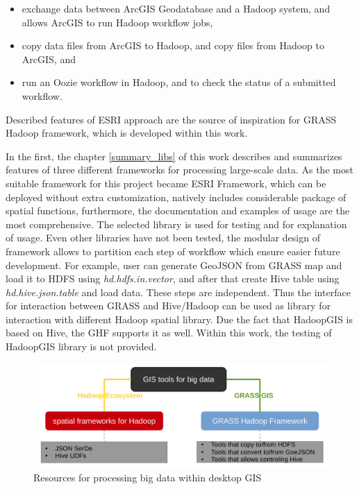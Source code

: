 \documentclass[a4paper,12pt,oneside]{report}
\begin{document}
	\begin{itemize}
		\item exchange data between ArcGIS Geodatabase and a Hadoop system, and allows
		ArcGIS to run Hadoop workflow jobs,
		\item copy data files from ArcGIS to Hadoop, and copy files from Hadoop to
		ArcGIS, and 
		\item run an Oozie workflow in Hadoop, and to check the status of a submitted
		workflow.
	\end{itemize}
	
    Described features of ESRI approach are the source of inspiration for GRASS Hadoop framework, 
    which is developed within this work.
    
    In the first, the chapter \ref{summary_libs} of this work describes and
    summarizes features of three different frameworks for processing large-scale
    data. As the most suitable framework for this project became ESRI Framework, which
    can be deployed without extra customization, natively includes considerable
    package of spatial functions, furthermore, the documentation and examples of
    usage are the most comprehensive. The selected library is used for testing
    and for explanation of usage. Even other libraries have
    not been tested, the modular design of framework allows to partition each step
    of workflow which ensure easier future development. For example,
    user can generate GeoJSON from GRASS map and load it to HDFS using
    \textit{hd.hdfs.in.vector}, and after that create Hive table using
    \textit{hd.hive.json.table} and load data. These steps are independent.
    Thus the interface for interaction between GRASS and
    Hive/Hadoop can be used as library for interaction with different Hadoop spatial library.
    Due the fact that HadoopGIS is based on Hive, the GHF supports it as well. 
    Within this work, the testing of HadoopGIS library is not provided.

	
	\begin{figure}[!htbp]
		\centering
		\includegraphics[width=1\textwidth]{./img/idea_schema.pdf}
		\caption[GHF Resources]{\centering Resources for processing big data within
			desktop GIS}
	\end{figure} 
	
\end{document}
